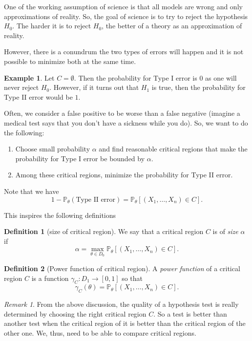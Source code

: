 \documentclass[
  openany]{book}
\theoremstyle{definition}
\newtheorem{definition}{Definition}[chapter]
\theoremstyle{definition}
\newtheorem{example}{Example}[chapter]
\theoremstyle{definition}
\theoremstyle{definition}
\theoremstyle{remark}
\newtheorem*{remark}{Remark}
\begin{document}
One of the working assumption of science is that all models are wrong and only approximations
of reality. So, the goal of science is to try to reject the hypothesis \(H_0\). The harder
it is to reject \(H_0\), the better of a theory as an approximation of reality.

However, there is a conundrum the two types of errors will happen and it is
not possible to minimize both at the same time.

\begin{example}
Let \(C = \emptyset\). Then the probability for Type I error is \(0\) as one will never
reject \(H_0\).
However, if it turns out that \(H_1\) is true, then the probability for Type II error
would be \(1\).
\end{example}

Often, we consider a false positive to be worse than a false negative (imagine
a medical test says that you don't have a sickness while you do).
So, we want to do the following:

\begin{enumerate}
\def\labelenumi{\arabic{enumi}.}
\item
  Choose small probability \(\alpha\) and find reasonable
  critical regions that make the probability for Type I error be bounded by \(\alpha\).
\item
  Among these critical regions, minimize the probability for Type II error.
\end{enumerate}

Note that we have
\[ 1 - \mathbb{P}_\theta ( \text{Type II error}) = \mathbb{P}_\theta \left[ (X_1, \dots, X_n) \in C  \right].\]

This inspires the following definitions

\begin{definition}[size of critical region]
We say that a critical region \(C\) is of \emph{size} \(\alpha\) if
\[ \alpha = \max_{\theta \in D_0} \mathbb{P}_\theta \left[ (X_1, \dots, X_n) \in C  \right].\]
\end{definition}

\begin{definition}[Power function of critical region]
A \emph{power function} of a critical region \(C\) is a function \(\gamma_C: D_1 \to [0,1]\)
so that
\[ \gamma_C(\theta) = \mathbb{P}_\theta \left[ (X_1, \dots, X_n) \in C  \right].\]
\end{definition}

\begin{remark}
From the above discussion, the quality of a hypothesis test is really determined by
choosing the right critical region \(C\). So a test is better than another test
when the critical region of it is better than the critical region of the other one.
We, thus, need to be able to compare critical regions.
\end{remark}
\end{document}
